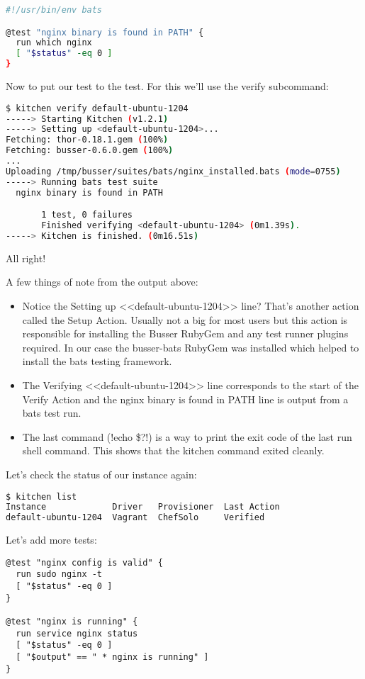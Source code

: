 \begin{lstlisting}[language=Bash,label=lst:testing-test-kitchen14]
#!/usr/bin/env bats

@test "nginx binary is found in PATH" {
  run which nginx
  [ "$status" -eq 0 ]
}
\end{lstlisting}

Now to put our test to the test. For this we'll use the verify subcommand:

\begin{lstlisting}[language=Bash,label=lst:testing-test-kitchen15]
$ kitchen verify default-ubuntu-1204
-----> Starting Kitchen (v1.2.1)
-----> Setting up <default-ubuntu-1204>...
Fetching: thor-0.18.1.gem (100%)
Fetching: busser-0.6.0.gem (100%)
...
Uploading /tmp/busser/suites/bats/nginx_installed.bats (mode=0755)
-----> Running bats test suite
  nginx binary is found in PATH

       1 test, 0 failures
       Finished verifying <default-ubuntu-1204> (0m1.39s).
-----> Kitchen is finished. (0m16.51s)
\end{lstlisting}

All right!

A few things of note from the output above:

\begin{itemize}
  \item Notice the Setting up <<default-ubuntu-1204>> line? That's another action called the Setup Action. Usually not a big for most users but this action is responsible for installing the Busser RubyGem and any test runner plugins required. In our case the busser-bats RubyGem was installed which helped to install the bats testing framework.
  \item The Verifying <<default-ubuntu-1204>> line corresponds to the start of the Verify Action and the nginx binary is found in PATH line is output from a bats test run.
  \item The last command (\inline!echo \$?!) is a way to print the exit code of the last run shell command. This shows that the kitchen command exited cleanly.
\end{itemize}

Let's check the status of our instance again:

\begin{lstlisting}[language=Bash,label=lst:testing-test-kitchen16]
$ kitchen list
Instance             Driver   Provisioner  Last Action
default-ubuntu-1204  Vagrant  ChefSolo     Verified
\end{lstlisting}

Let's add more tests:

\begin{lstlisting}[label=lst:testing-test-kitchen17]
@test "nginx config is valid" {
  run sudo nginx -t
  [ "$status" -eq 0 ]
}

@test "nginx is running" {
  run service nginx status
  [ "$status" -eq 0 ]
  [ "$output" == " * nginx is running" ]
}
\end{lstlisting}
